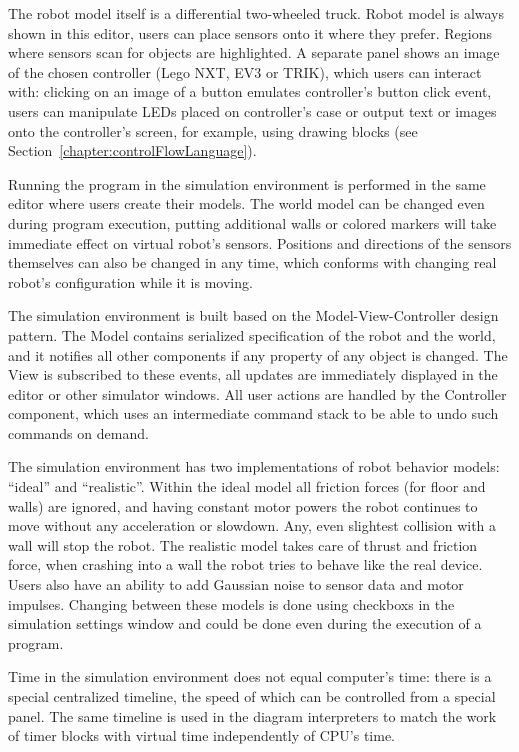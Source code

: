 \documentclass[conference]{IEEEtran}
\begin{document}
The robot model itself is a differential two-wheeled truck. Robot model is always shown in this editor, users can place sensors onto it where they prefer. Regions where sensors scan for objects are highlighted. A separate panel shows an image of the chosen controller (Lego NXT, EV3 or TRIK), which users can interact with: clicking on an image of a button emulates controller's button click event, users can manipulate LEDs placed on controller's case or output text or images onto the controller's screen, for example,  using drawing blocks (see Section~\ref{chapter:controlFlowLanguage}).

Running the program in the simulation environment is performed in the same editor where users create their models. The world model can be changed even during program execution, putting additional walls or colored markers will take immediate effect on virtual robot's sensors. Positions and directions of the sensors themselves can also be changed in any time, which conforms with changing real robot's configuration while it is moving.

The simulation environment is built based on the Model-View-Controller design pattern. The Model contains serialized specification of the robot and the world, and it notifies all other components if any property of any object is changed. The View is subscribed to these events, all updates are immediately displayed in the editor or other simulator windows. All user actions are handled by the Controller component, which uses an intermediate command stack to be able to undo such commands on demand.

The simulation environment has two implementations of robot behavior models: ``ideal'' and ``realistic''. Within the ideal model all friction forces (for floor and walls) are ignored, and having constant motor powers the robot continues to move without any acceleration or slowdown. Any, even slightest collision with a wall will stop the robot. The realistic model takes care of thrust and friction force, when crashing into a wall the robot tries to behave like the real device. Users also have an ability to add Gaussian noise to sensor data and motor impulses. Changing between these models is done using checkboxs in the simulation settings window and could be done even during the execution of a program. 

Time in the simulation environment does not equal computer's time: there is a special centralized timeline, the speed of which can be controlled from a special panel. The same timeline is used in the diagram interpreters to match the work of timer blocks with virtual time independently of CPU's time.
\end{document}
